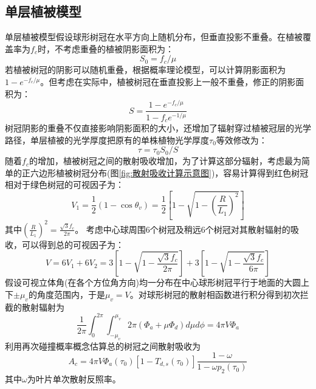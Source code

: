 \subsection{单层植被模型}
单层植被模型假设球形树冠在水平方向上随机分布，但垂直投影不重叠。在植被覆盖率为$f_c$时，不考虑重叠的植被阴影面积为：
\begin{equation}
S_{0}=f_{c} / \mu
\end{equation}
若植被树冠的阴影可以随机重叠，根据概率理论模型，可以计算阴影面积为$1-e^{-f_c/\mu}$。但考虑在实际中，植被树冠在垂直投影上一般不重叠，修正的阴影面积为：
\begin{equation}\label{S_area}
S=\frac{1-e^{-f_{c} / \mu}}{1-f_{c} e^{-1 / \mu}}
\end{equation}
树冠阴影的重叠不仅直接影响阴影面积的大小，还增加了辐射穿过植被冠层的光学路径，单层植被的光学厚度把原有的单株植物光学厚度$\tau_0$等效修改为：
\begin{equation}\label{tau}
\tau=\tau_{0} S_{0} / S
\end{equation}
随着$f_c$的增加，植被树冠之间的散射吸收增加，为了计算这部分辐射，考虑最为简单的正六边形植被树冠分布(图\ref{fig:散射吸收计算示意图})，容易计算得到红色树冠相对于绿色树冠的可视因子为：
\begin{equation}
V_{1}=\frac{1}{2}\left(1-\cos \theta_{v}\right)=\frac{1}{2}\left[1-\sqrt{1-\left(\frac{R}{L_{1}}\right)^{2}}\right]
\end{equation}
其中$\left(\frac{R}{L_{1}}\right)^{2}=\frac{\sqrt{3} f_{c}}{2 \pi}$。
考虑中心球周围6个树冠及稍远6个树冠对其散射辐射的吸收，可以得到总的可视因子为：
\begin{equation}
V=6 V_{1}+6 V_{2}=3\left[1-\sqrt{1-\frac{\sqrt{3} f_{c}}{2 \pi}}\right]+3\left[1-\sqrt{1-\frac{\sqrt{3} f_{c}}{6 \pi}}\right]
\end{equation}
假设可视立体角(在各个方位角方向)均一分布在中心球形树冠平行于地面的大圆上下$\pm\mu_v$的角度范围内，于是$\mu_v=V$。对球形树冠的散射相函数进行积分得到初次拦截的散射辐射为
\begin{equation}
\frac{1}{2 \pi} \int_{0}^{2 \pi} \int_{-\mu_{v}}^{\mu_{v}} 2 \pi\left(\Phi_{a}+\mu \Phi_{d}\right) d \mu d \phi=4 \pi V \Phi_{a}
\end{equation}
利用再次碰撞概率概念估算总的树冠之间散射吸收为
\begin{equation}
A_{c}=4 \pi V \Phi_{a}\left(\tau_{0}\right)\left[1-T_{d, s}\left(\tau_{0}\right)\right] \frac{1-\omega}{1-\omega p_{2}\left(\tau_{0}\right)}
\end{equation}
其中$\omega$为叶片单次散射反照率。

